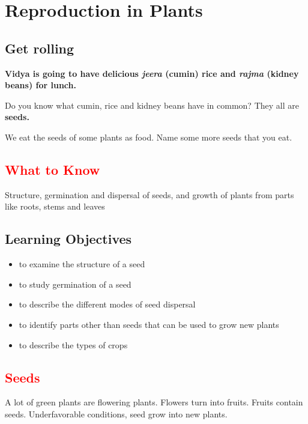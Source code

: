 \chapter{Reproduction in Plants}

\section{Get rolling}

\textbf{Vidya is going to have delicious \textit{jeera} (cumin) rice and \textit{rajma} (kidney beans) for lunch.}
\par
Do you know what cumin, rice and kidney beans have in common? They all are \textbf{seeds.}
\par
We eat the seeds of some plants as food. Name some more seeds that you eat.

\section{\textcolor{red}{What to Know}}
Structure, germination and dispersal of seeds, and growth of plants from parts like roots, stems and leaves
\section{\textbf{Learning Objectives}}

\begin{itemize}
    \item to examine the structure of a seed
    \item to study germination of a seed
    \item to describe the different modes of seed dispersal
    \item to identify parts other than seeds that can be used to grow new plants
    \item to describe the types of crops
\end{itemize}
\section{\textcolor{red}{Seeds}} 
A lot of green plants are flowering plants. Flowers turn into fruits. Fruits contain seeds. Underfavorable conditions, seed grow into new plants.
